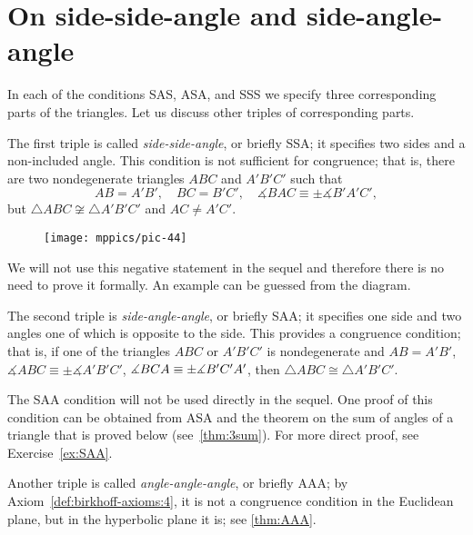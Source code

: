 \section{On side-side-angle and side-angle-angle}

In each of the conditions SAS, ASA, and SSS we specify three corresponding parts of the triangles.
Let us discuss other triples of corresponding parts.

The first triple is called {}\emph{side-side-angle}, or briefly SSA;
it specifies two sides and a non-included angle.
This condition is not sufficient for congruence;
that is, there are two nondegenerate triangles $ABC$ and $A'B'C'$ such that
\[AB=A'B',\quad BC=B'C',\quad \measuredangle BAC\equiv\pm \measuredangle B'A'C',\]
but $\triangle ABC\not\cong\triangle A'B'C'$ and $AC\ne A'C'$.

\begin{wrapfigure}{r}{35mm}
\vskip-6mm
\centering
\texttt{[image: mppics/pic-44]}
\end{wrapfigure}

We will not use this negative statement in the sequel and therefore there is no need to prove it formally.
An example can be guessed from the diagram.

The second triple is {}\emph{side-angle-angle}, or briefly SAA;
it specifies one side and two angles one of which is opposite to the side.
This provides a congruence condition; 
that is, if one of the triangles $ABC$ or $A'B'C'$ is nondegenerate and
$AB=A'B'$, $\measuredangle ABC\equiv\pm \measuredangle A'B'C'$, $\measuredangle BCA\z\equiv\pm \measuredangle B'C'A'$,
then $\triangle ABC\cong\triangle A'B'C'$.

The SAA condition will not be used directly in the sequel.
One proof of this condition can be obtained from ASA and the theorem on the sum of angles of a triangle that is proved below (see~\ref{thm:3sum}). 
For more direct proof, see Exercise~\ref{ex:SAA}.

Another triple is called {}\emph{angle-angle-angle}, or briefly AAA;
by Axiom~\ref{def:birkhoff-axioms:4}, it is not a congruence condition in the Euclidean plane, but in the hyperbolic plane it is; see \ref{thm:AAA}.
